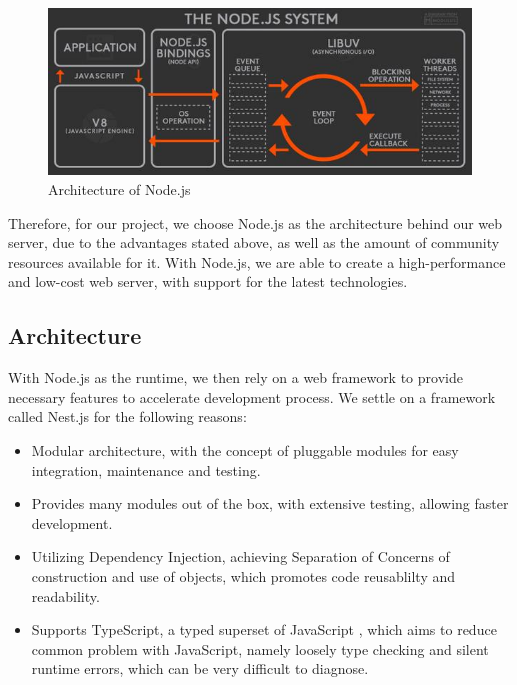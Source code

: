 \begin{figure}[!h]
	\centering
	\includegraphics[scale=0.6]{Picture/server/node.jpg}
	\caption{Architecture of Node.js}
\label{fig:node}
\end{figure}

Therefore, for our project, we choose Node.js as the architecture behind our web server, due to the advantages stated above, as well as the amount of community resources available for it. With Node.js, we are able to create a high-performance and low-cost web server, with support for the latest technologies.

\subsection{Architecture}
With Node.js as the runtime, we then rely on a web framework to provide necessary features to accelerate development process. We settle on a framework called Nest.js for the following reasons:
\begin{itemize}
\item Modular architecture, with the concept of pluggable modules for easy integration, maintenance and testing.
\item Provides many modules out of the box, with extensive testing, allowing faster development.
\item Utilizing Dependency Injection, achieving Separation of Concerns of construction and use of objects, which promotes code reusablilty and readability.
\item Supports TypeScript, a typed superset of JavaScript \cite{typescript}, which aims to reduce common problem with JavaScript, namely loosely type checking and silent runtime errors, which can be very difficult to diagnose.
\end{itemize}


